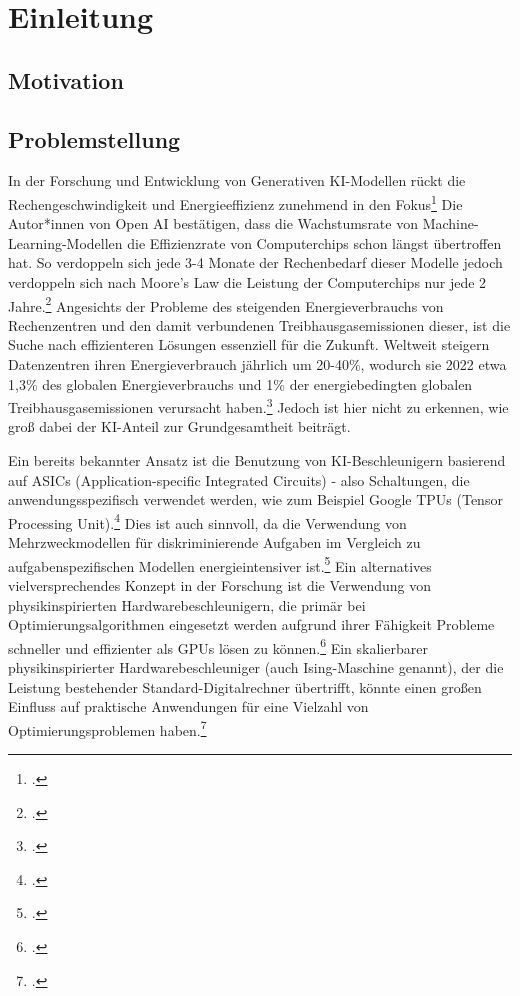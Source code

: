 \chapter{Einleitung}


\section{Motivation}
\section{Problemstellung}

In der Forschung und Entwicklung von Generativen KI-Modellen rückt die
Rechengeschwindigkeit und Energieeffizienz zunehmend in den Fokus\footcite[Vgl.][1]{luccioniPowerHungryProcessing2023}
Die Autor*innen von Open AI bestätigen, dass die Wachstumsrate von
Machine-Learning-Modellen die Effizienzrate von Computerchips schon längst
übertroffen hat. So verdoppeln sich jede 3-4 Monate der Rechenbedarf dieser
Modelle jedoch verdoppeln sich nach Moore’s Law die Leistung der Computerchips
nur jede 2 Jahre.\footcite[Vgl.][1]{darioamodeiAICompute}
Angesichts der Probleme des steigenden Energieverbrauchs von Rechenzentren
und den damit verbundenen Treibhausgasemissionen dieser, ist die Suche nach
effizienteren Lösungen essenziell für die Zukunft. Weltweit steigern Datenzentren
ihren Energieverbrauch jährlich um 20-40\%, wodurch sie 2022 etwa 1,3\% des
globalen Energieverbrauchs und 1\% der energiebedingten globalen
Treibhausgasemissionen verursacht haben.\footcite[Vgl.][1]{hintemannDataCenters20212022} 
Jedoch ist hier nicht zu erkennen, wie groß dabei der KI-Anteil zur Grundgesamtheit beiträgt.

Ein bereits bekannter Ansatz ist die Benutzung von KI-Beschleunigern basierend auf
ASICs (Application-specific Integrated Circuits) - also Schaltungen, die
anwendungsspezifisch verwendet werden, wie zum Beispiel Google TPUs (Tensor
Processing Unit).\footcite[Vgl.][39]{wittpahlKuenstlicheIntelligenzTechnologie2019} 
Dies ist auch sinnvoll, da die Verwendung von Mehrzweckmodellen für diskriminierende Aufgaben im Vergleich zu
aufgabenspezifischen Modellen energieintensiver ist.\footcite[Vgl.][5]{luccioniPowerHungryProcessing2023}
Ein alternatives vielversprechendes Konzept in der Forschung ist die Verwendung von
physikinspirierten Hardwarebeschleunigern, die primär bei Optimierungsalgorithmen
eingesetzt werden aufgrund ihrer Fähigkeit Probleme schneller und effizienter als
GPUs lösen zu können.\footcite[Vgl.][1]{mohseniIsingMachinesHardware2022}
Ein skalierbarer physikinspirierter Hardwarebeschleuniger (auch Ising-Maschine
genannt), der die Leistung bestehender Standard-Digitalrechner übertrifft, könnte
einen großen Einfluss auf praktische Anwendungen für eine Vielzahl von
Optimierungsproblemen haben.\footcite[Vgl.][1]{mohseniIsingMachinesHardware2022}


